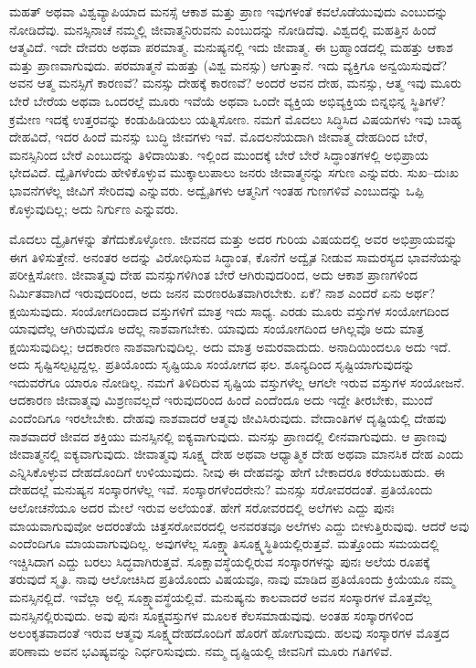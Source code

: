 \vskip 0.2cm

ಮಹತ್​ ಅಥವಾ ವಿಶ್ವವ್ಯಾಪಿಯಾದ ಮನಸ್ಸೆ ಆಕಾಶ ಮತ್ತು ಪ್ರಾಣ ಇವುಗಳಂತೆ ಕವಲೊಡೆಯುವುದು ಎಂಬುದನ್ನು ನೋಡಿದೆವು. ಮನಸ್ಸಿನಾಚೆ ನಮ್ಮಲ್ಲಿ ಜೀವಾತ್ಮನಿರುವನು ಎಂಬುದನ್ನು ನೋಡಿದೆವು. ವಿಶ್ವದಲ್ಲಿ ಮಹತ್ತಿನ ಹಿಂದೆ ಆತ್ಮವಿದೆ. ಇದೇ ದೇವರು ಅಥವಾ ಪರಮಾತ್ಮ. ಮನುಷ್ಯನಲ್ಲಿ ಇದು ಜೀವಾತ್ಮ. ಈ ಬ್ರಹ್ಮಾಂಡದಲ್ಲಿ ಮಹತ್ತು ಆಕಾಶ ಮತ್ತು ಪ್ರಾಣವಾಗುವುದು. ಪರಮಾತ್ಮನೆ ಮಹತ್ತು (ವಿಶ್ವ ಮನಸ್ಸು) ಆಗುತ್ತಾನೆ. ಇದು ವ್ಯಕ್ತಿಗೂ ಅನ್ವಯಿಸುವುದೆ? ಅವನ ಆತ್ಮ ಮನಸ್ಸಿಗೆ ಕಾರಣವೆ? ಮನಸ್ಸು ದೇಹಕ್ಕೆ ಕಾರಣವೆ? ಅಂದರೆ ಅವನ ದೇಹ, ಮನಸ್ಸು, ಆತ್ಮ ಇವು ಮೂರು ಬೇರೆ ಬೇರೆಯ ಅಥವಾ ಒಂದರಲ್ಲೆ ಮೂರು ಇವೆಯೆ ಅಥವಾ ಒಂದೇ ವ್ಯಕ್ತಿಯ ಅಭಿವ್ಯಕ್ತಿಯ ಬಿನ್ನಭಿನ್ನ ಸ್ಥಿತಿಗಳೆ? ಕ್ರಮೇಣ ಇದಕ್ಕೆ ಉತ್ತರವನ್ನು ಕಂಡುಹಿಡಿಯಲು ಯತ್ನಿಸೋಣ. ನಮಗೆ ಮೊದಲು ಸಿದ್ಧಿಸಿದ ವಿಷಯಗಳು ಇವು ಬಾಹ್ಯ ದೇಹವಿದೆ, ಇದರ ಹಿಂದೆ ಮನಸ್ಸು ಬುದ್ಧಿ ಜೀವಗಳು ಇವೆ. ಮೊದಲನೆಯದಾಗಿ ಜೀವಾತ್ಮ ದೇಹದಿಂದ ಬೇರೆ, ಮನಸ್ಸಿನಿಂದ ಬೇರೆ ಎಂಬುದನ್ನು ತಿಳಿದಾಯಿತು. ಇಲ್ಲಿಂದ ಮುಂದಕ್ಕೆ ಬೇರೆ ಬೇರೆ ಸಿದ್ಧಾಂತಗಳಲ್ಲಿ ಅಭಿಪ್ರಾಯ ಭೇದವಿದೆ. ದ್ವೈತಿಗಳೆಂದು ಹೇಳಿಕೊಳ್ಳುವ ಮುಕ್ಕಾಲುಪಾಲು ಜನರು ಜೀವಾತ್ಮನನ್ನು ಸಗುಣ ಎನ್ನುವರು. ಸುಖ–ದುಃಖ ಭಾವನೆಗಳೆಲ್ಲ ಜೀವಿಗೆ ಸೇರಿದವು ಎನ್ನುವರು. ಅದ್ವೈತಿಗಳು ಆತ್ಮನಿಗೆ ಇಂತಹ ಗುಣಗಳಿವೆ ಎಂಬುದನ್ನು ಒಪ್ಪಿ ಕೊಳ್ಳುವುದಿಲ್ಲ; ಅದು ನಿರ್ಗುಣ ಎನ್ನುವರು.

\vskip 0.2cm

ಮೊದಲು ದ್ವೈತಿಗಳನ್ನು ತೆಗೆದುಕೊಳ್ಳೋಣ. ಜೀವನದ ಮತ್ತು ಅದರ ಗುರಿಯ ವಿಷಯದಲ್ಲಿ ಅವರ ಅಭಿಪ್ರಾಯವನ್ನು ಈಗ ತಿಳಿಸುತ್ತೇನೆ. ಅನಂತರ ಅದನ್ನು ವಿರೋಧಿಸುವ ಸಿದ್ಧಾಂತ, ಕೊನೆಗೆ ಅದ್ವೈತ ನೀಡುವ ಸಾಮರಸ್ಯದ ಭಾವನೆಯನ್ನು ಪರೀಕ್ಷಿಸೋಣ. ಜೀವಾತ್ಮವು ದೇಹ ಮನಸ್ಸುಗಳಿಗಿಂತ ಬೇರೆ ಆಗಿರುವುದರಿಂದ, ಅದು ಆಕಾಶ ಪ್ರಾಣಗಳಿಂದ ನಿರ್ಮಿತವಾಗಿದೆ ಇರುವುದರಿಂದ, ಅದು ಜನನ ಮರಣರಹಿತವಾಗಿರಬೇಕು. ಏಕೆ? ನಾಶ ಎಂದರೆ ಏನು ಅರ್ಥ? ಕ್ಷಯಿಸುವುದು. ಸಂಯೋಗದಿಂದಾದ ವಸ್ತುಗಳಿಗೆ ಮಾತ್ರ ಇದು ಸಾಧ್ಯ. ಎರಡು ಮೂರು ವಸ್ತುಗಳ ಸಂಯೋಗದಿಂದ ಯಾವುದೆಲ್ಲ ಆಗಿರುವುದೊ ಅದೆಲ್ಲ ನಾಶವಾಗಬೇಕು. ಯಾವುದು ಸಂಯೋಗದಿಂದ ಆಗಿಲ್ಲವೊ ಅದು ಮಾತ್ರ ಕ್ಷಯಿಸುವುದಿಲ್ಲ; ಆದಕಾರಣ ನಾಶವಾಗುವುದಿಲ್ಲ. ಅದು ಮಾತ್ರ ಅಮರವಾದುದು. ಅನಾದಿಯಿಂದಲೂ ಅದು ಇದೆ. ಅದು ಸೃಷ್ಟಿಸಲ್ಪಟ್ಟದ್ದಲ್ಲ. ಪ್ರತಿಯೊಂದು ಸೃಷ್ಟಿಯೂ ಸಂಯೋಗದ ಫಲ. ಶೂನ್ಯದಿಂದ ಸೃಷ್ಟಿಯಾಗುವುದನ್ನು ಇದುವರೆಗೂ ಯಾರೂ ನೋಡಿಲ್ಲ. ನಮಗೆ ತಿಳಿದಿರುವ ಸೃಷ್ಟಿಯ ವಸ್ತುಗಳೆಲ್ಲ ಆಗಲೇ ಇರುವ ವಸ್ತುಗಳ ಸಂಯೋಜನೆ. ಆದಕಾರಣ ಜೀವಾತ್ಮವು ಮಿಶ್ರಣವಲ್ಲದೆ ಇರುವುದರಿಂದ ಹಿಂದೆ ಎಂದೆಂದೂ ಅದು ಇದ್ದೇ ತೀರಬೇಕು, ಮುಂದೆ ಎಂದೆಂದಿಗೂ ಇರಲೇಬೇಕು. ದೇಹವು ನಾಶವಾದರೆ ಆತ್ಮವು ಜೀವಿಸಿರುವುದು. ವೇದಾಂತಿಗಳ ದೃಷ್ಟಿಯಲ್ಲಿ ದೇಹವು ನಾಶವಾದರೆ ಜೀವದ ಶಕ್ತಿಯು ಮನಸ್ಸಿನಲ್ಲಿ ಐಕ್ಯವಾಗುವುದು. ಮನಸ್ಸು ಪ್ರಾಣದಲ್ಲಿ ಲೀನವಾಗುವುದು. ಆ ಪ್ರಾಣವು ಜೀವಾತ್ಮನಲ್ಲಿ ಐಕ್ಯವಾಗುವುದು. ಜೀವಾತ್ಮವು ಸೂಕ್ಷ್ಮ ದೇಹ ಅಥವಾ ಆಧ್ಯಾತ್ಮಿಕ ದೇಹ ಅಥವಾ ಮಾನಸಿಕ ದೇಹ ಎಂದು ಎನ್ನಿಸಿಕೊಳ್ಳುವ ದೇಹದೊಂದಿಗೆ ಉಳಿಯುವುದು. ನೀವು ಈ ದೇಹವನ್ನು ಹೇಗೆ ಬೇಕಾದರೂ ಕರೆಯಬಹುದು. ಈ ದೇಹದಲ್ಲೆ ಮನುಷ್ಯನ ಸಂಸ್ಕಾರಗಳೆಲ್ಲ ಇವೆ. ಸಂಸ್ಕಾರಗಳೆಂದರೇನು? ಮನಸ್ಸು ಸರೋವರದಂತೆ. ಪ್ರತಿಯೊಂದು ಆಲೋಚನೆಯೂ ಅದರ ಮೇಲೆ ಇರುವ ಅಲೆಯಂತೆ. ಹೇಗೆ ಸರೋವರದಲ್ಲಿ ಅಲೆಗಳು ಎದ್ದು ಪುನಃ ಮಾಯವಾಗುವುವೋ ಅದರಂತೆಯೆ ಚಿತ್ತಸರೋವರದಲ್ಲಿ ಅನವರತವೂ ಅಲೆಗಳು ಎದ್ದು ಬೀಳುತ್ತಿರುವುವು. ಆದರೆ ಅವು ಎಂದೆಂದಿಗೂ ಮಾಯವಾಗುವುದಿಲ್ಲ. ಅವುಗಳೆಲ್ಲ ಸೂಕ್ಷ್ಮಾತಿಸೂಕ್ಷ್ಮಸ್ಥಿತಿಯಲ್ಲಿರುತ್ತವೆ. ಮತ್ತೊಂದು ಸಮಯದಲ್ಲಿ ಇಚ್ಚಿಸಿದಾಗ ಎದ್ದು ಬರಲು ಸಿದ್ಧವಾಗಿರುತ್ತವೆ. ಸೂಕ್ಷಾವಸ್ಥೆಯಲ್ಲಿರುವ ಸಂಸ್ಕಾರಗಳನ್ನು ಪುನಃ ಅಲೆಯ ರೂಪಕ್ಕೆ ತರುವುದೆ ಸ್ಮೃತಿ. ನಾವು ಆಲೋಚಿಸಿದ ಪ್ರತಿಯೊಂದು ವಿಷಯವೂ, ನಾವು ಮಾಡಿದ ಪ್ರತಿಯೊಂದು ಕ್ರಿಯೆಯೂ ನಮ್ಮ ಮನಸ್ಸಿನಲ್ಲಿದೆ. ಇವೆಲ್ಲಾ ಅಲ್ಲಿ ಸೂಕ್ಷ್ಮಾವಸ್ಥೆಯಲ್ಲಿವೆ. ಮನುಷ್ಯನು ಕಾಲವಾದರೆ ಅವನ ಸಂಸ್ಕಾರಗಳ ಮೊತ್ತವೆಲ್ಲ ಮನಸ್ಸಿನಲ್ಲಿರುವುದು. ಅವು ಪುನಃ ಸೂಕ್ಷ್ಮವಸ್ತುಗಳ ಮೂಲಕ ಕೆಲಸಮಾಡುವುವು. ಅಂತಹ ಸಂಸ್ಕಾರಗಳಿಂದ ಅಲಂಕೃತವಾದಂತೆ ಇರುವ ಆತ್ಮವು ಸೂಕ್ಷ್ಮದೇಹದೊಂದಿಗೆ ಹೊರಗೆ ಹೋಗುವುದು. ಹಲವು ಸಂಸ್ಕಾರಗಳ ಮೊತ್ತದ ಪರಿಣಾಮ ಅವನ ಭವಿಷ್ಯವನ್ನು ನಿರ್ಧರಿಸುವುದು. ನಮ್ಮ ದೃಷ್ಟಿಯಲ್ಲಿ ಜೀವನಿಗೆ ಮೂರು ಗತಿಗಳಿವೆ.

